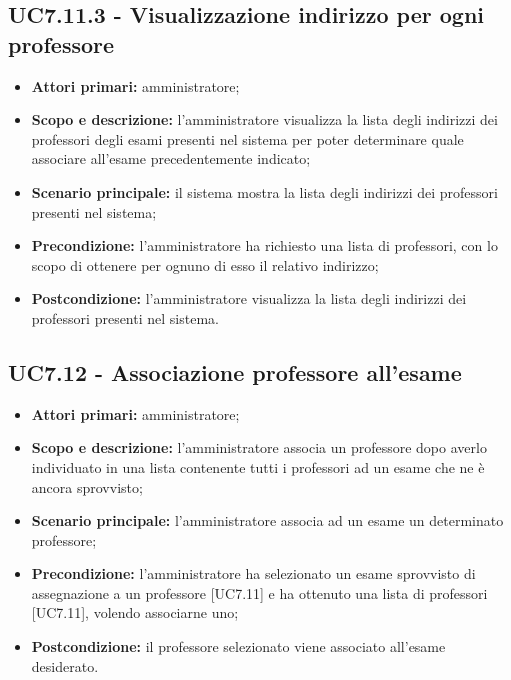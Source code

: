\documentclass[AnalisiDeiRequisiti.tex]{subfiles}
\begin{document}
\subsection{UC7.11.3 - Visualizzazione indirizzo per ogni professore}
\begin{itemize}
	\item \textbf{Attori primari:} amministratore;
	\item \textbf{Scopo e descrizione:} l'amministratore visualizza la lista degli indirizzi dei professori degli esami presenti nel sistema per poter determinare quale associare all'esame precedentemente indicato;
	\item \textbf{Scenario principale:} il sistema mostra la lista degli indirizzi dei professori presenti nel sistema;
	\item \textbf{Precondizione:} l'amministratore ha richiesto una lista di professori, con lo scopo di ottenere per ognuno di esso il relativo indirizzo; 
	\item \textbf{Postcondizione:} l'amministratore visualizza la lista degli indirizzi dei professori presenti nel sistema.
\end{itemize}
\subsection{UC7.12 - Associazione professore all'esame}
\begin{itemize}
	\item \textbf{Attori primari:} amministratore;
	\item \textbf{Scopo e descrizione:} l'amministratore associa un professore dopo averlo individuato in una lista contenente tutti i professori ad un esame che ne è ancora sprovvisto;
	\item \textbf{Scenario principale:} l'amministratore associa ad un esame un determinato professore;
	\item \textbf{Precondizione:} l'amministratore ha selezionato un esame sprovvisto di assegnazione a un professore [UC7.11] e ha ottenuto una lista di professori [UC7.11], volendo associarne uno; 
	\item \textbf{Postcondizione:} il professore selezionato viene associato all'esame desiderato.
\end{itemize}
\end{document}
